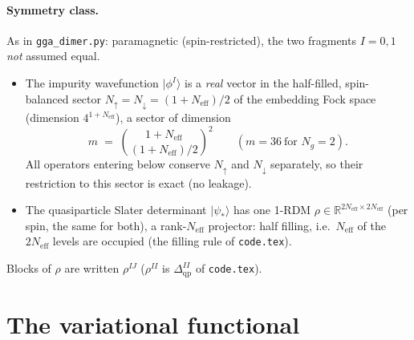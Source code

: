 \documentclass[11pt]{article}
\newcommand{\Neff}{N_{\mathrm{eff}}}
\newcommand{\Ng}{N_{g}}
\begin{document}
\paragraph{Symmetry class.} As in \texttt{gga\_dimer.py}: paramagnetic (spin-restricted),
the two fragments $I=0,1$ \emph{not} assumed equal.
\begin{itemize}
  \item The impurity wavefunction $|\phi^I\rangle$ is a \emph{real} vector in the
    half-filled, spin-balanced sector $N_\uparrow=N_\downarrow=(1+\Neff)/2$ of the
    embedding Fock space (dimension $4^{1+\Neff}$), a sector of dimension
    \begin{equation}
      m \;=\; \binom{1+\Neff}{(1+\Neff)/2}^{2}
      \qquad(m=36\ \text{for }\Ng=2).
    \end{equation}
    All operators entering below conserve $N_\uparrow$ and $N_\downarrow$ separately, so
    their restriction to this sector is exact (no leakage).
  \item The quasiparticle Slater determinant $|\psi_*\rangle$ has one 1-RDM
    $\rho\in\mathbb R^{2\Neff\times2\Neff}$ (per spin, the same for both), a rank-$\Neff$
    projector: half filling, i.e.\ $\Neff$ of the $2\Neff$ levels are occupied
    (the filling rule of \texttt{code.tex}).
\end{itemize}
Blocks of $\rho$ are written $\rho^{IJ}$ ($\rho^{II}$ is $\Delta^{II}_{\mathrm{qp}}$ of
\texttt{code.tex}).

\section{The variational functional}
\label{sec:functional}
\end{document}
